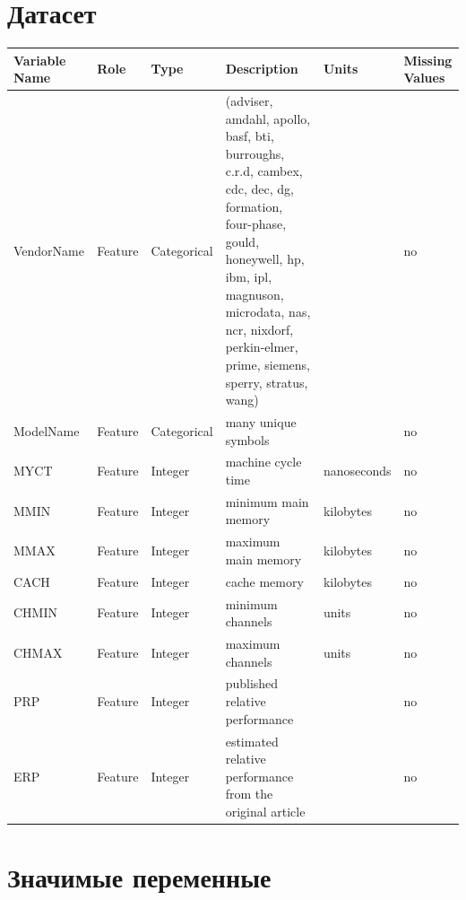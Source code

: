 \section{Датасет}

\begin{longtable}{|p{3cm}|p{2cm}|p{2.5cm}|p{6cm}|p{3cm}|p{3cm}|}
\hline
\textbf{Variable Name} & \textbf{Role} & \textbf{Type} & \textbf{Description} & \textbf{Units} & \textbf{Missing Values} \\
\hline

VendorName & Feature & Categorical & (adviser, amdahl, apollo, basf, bti, burroughs, c.r.d, cambex, cdc, dec, dg, formation, four-phase, gould, honeywell, hp, ibm, ipl, magnuson, microdata, nas, ncr, nixdorf, perkin-elmer, prime, siemens, sperry, stratus, wang) &  & no \\
\hline

ModelName & Feature & Categorical & many unique symbols &  & no \\
\hline

MYCT & Feature & Integer & machine cycle time & nanoseconds & no \\
\hline

MMIN & Feature & Integer & minimum main memory & kilobytes & no \\
\hline

MMAX & Feature & Integer & maximum main memory & kilobytes & no \\
\hline

CACH & Feature & Integer & cache memory & kilobytes & no \\
\hline

CHMIN & Feature & Integer & minimum channels & units & no \\
\hline

CHMAX & Feature & Integer & maximum channels & units & no \\
\hline

PRP & Feature & Integer & published relative performance &  & no \\
\hline

ERP & Feature & Integer & estimated relative performance from the original article &  & no \\
\hline

\end{longtable}


\section{Значимые переменные}

